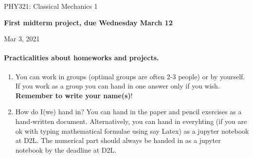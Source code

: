 \documentclass[%
oneside,                 %
final,                   %
10pt]{article}
\begin{document}

\newcommand{\exercisesection}[1]{\subsection*{#1}}






\thispagestyle{empty}

\begin{center}
{\LARGE\bf
\begin{spacing}{1.25}
PHY321: Classical Mechanics 1
\end{spacing}
}
\end{center}


\begin{center}
{\bf First midterm project, due Wednesday March 12${}^{}$} \\ [0mm]
\end{center}

\begin{center}
\end{center}
    

\begin{center}
Mar 3, 2021
\end{center}

\vspace{1cm}


\paragraph{Practicalities about  homeworks and projects.}
\begin{enumerate}
\item You can work in groups (optimal groups are often 2-3 people) or by yourself. If you work as a group you can hand in one answer only if you wish. \textbf{Remember to write your name(s)}!

\item How do I(we)  hand in?  You can hand in the paper and pencil exercises as a hand-written document. Alternatively, you can hand in everyhting (if you are ok with typing mathematical formulae using say Latex) as a jupyter notebook at D2L. The numerical part should always be handed in as a jupyter notebook by the deadline at D2L. 
\end{enumerate}
\end{document}
